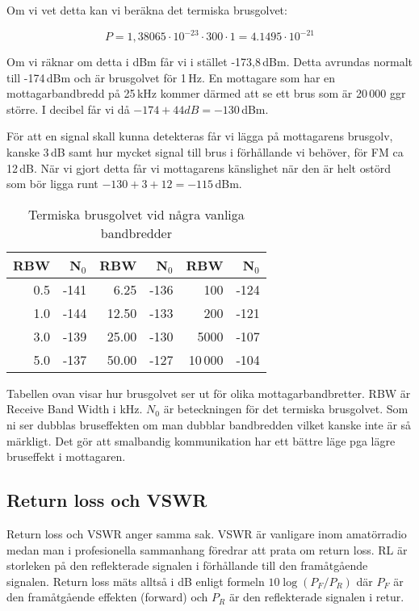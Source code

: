 Om vi vet detta kan vi beräkna det termiska brusgolvet:

$$P = 1,38065\cdot 10^{-23} \cdot 300 \cdot 1 = 4.1495\cdot 10^{-21}$$

Om vi räknar om detta i dBm får vi i stället -173,8\,dBm. Detta avrundas normalt till -174\,dBm och är brusgolvet för 1\,Hz. En mottagare som har en mottagarbandbredd på 25\,kHz kommer därmed att se ett brus som är 20\,000 ggr större. I decibel får vi då $-174 + 44 dB = -130$\,dBm.

För att en signal skall kunna detekteras får vi lägga på mottagarens brusgolv, kanske 3\,dB samt hur mycket signal till brus i förhållande vi behöver, för FM ca 12\,dB. När vi gjort detta får vi mottagarens känslighet när den är helt ostörd som bör ligga runt $-130 + 3 + 12 = -115$\,dBm.

\begin{table}[H]
\centering
\begin{tabular}{rr|rr|rr}
	\textbf{RBW} & \textbf{N$_0$} & \textbf{RBW} & \textbf{N$_0$} & \textbf{RBW} & \textbf{N$_0$} \\ \hline
	         0.5 &           -141 &         6.25 &           -136 &          100 &           -124 \\
	         1.0 &           -144 &        12.50 &           -133 &          200 &           -121 \\
	         3.0 &           -139 &        25.00 &           -130 &         5000 &           -107 \\
	         5.0 &           -137 &        50.00 &           -127 &        10\,000 &           -104
\end{tabular}
\caption{Termiska brusgolvet vid några vanliga bandbredder}
\end{table}

Tabellen ovan visar hur brusgolvet ser ut för olika mottagarbandbretter. RBW är Receive Band Width i kHz. $N_0$ är beteckningen för det termiska brusgolvet. Som ni ser dubblas bruseffekten om man dubblar bandbredden vilket kanske inte är så märkligt. Det gör att smalbandig kommunikation har ett bättre läge pga lägre bruseffekt i mottagaren.


\subsection{Return loss och VSWR}

Return loss och VSWR anger samma sak. VSWR är vanligare inom amatörradio medan man i profesionella sammanhang föredrar att prata om return loss. RL är storleken på den reflekterade signalen i förhållande till den framåtgående signalen. Return loss mäts alltså i dB enligt formeln $10\log(P_F/P_R)$ där $P_F$ är den framåtgående effekten (forward) och  $P_R$ är den reflekterade signalen i retur.


